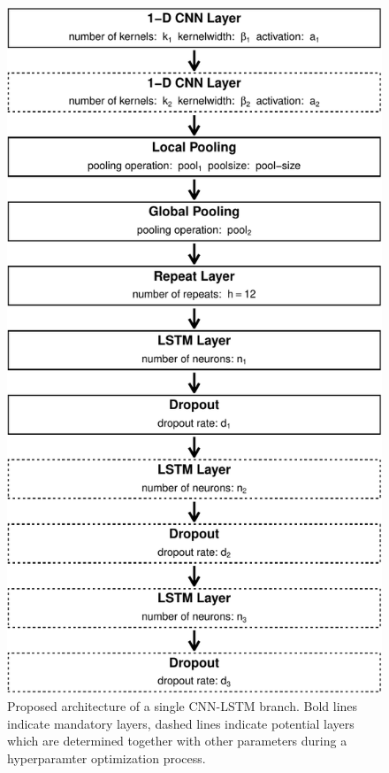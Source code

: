 \documentclass[a4paper,11pt]{article}
\begin{document}
\newpage
\begin{figure}[H]

{\centering \includegraphics{thesis_files/figure-latex/03-methods-arch-1} 

}

\caption[Proposed architecture of a single CNN-LSTM branch.]{Proposed architecture of a single CNN-LSTM branch. Bold lines indicate mandatory layers, dashed lines indicate potential layers which are determined together with other parameters during a hyperparamter optimization process.}\label{fig:03-methods-arch}
\end{figure}
\end{document}
